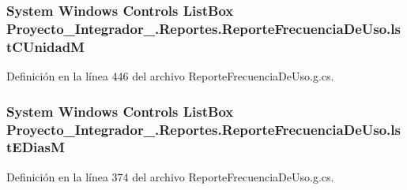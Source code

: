 \hypertarget{class_proyecto___integrador__3_1_1_reportes_1_1_reporte_frecuencia_de_uso_ab371c0b71730bbb785efdca10a7d2d41}{
\subsubsection[{lst\-C\-Unidad\-M}]{\setlength{\rightskip}{0pt plus 5cm}System Windows Controls List\-Box Proyecto\-\_\-\-Integrador\-\_.\-Reportes.\-Reporte\-Frecuencia\-De\-Uso.\-lst\-C\-Unidad\-M\hspace{0.3cm}{\ttfamily [package]}}}\label{class_proyecto___integrador__3_1_1_reportes_1_1_reporte_frecuencia_de_uso_ab371c0b71730bbb785efdca10a7d2d41}


Definición en la línea 446 del archivo Reporte\-Frecuencia\-De\-Uso.\-g.\-cs.

\hypertarget{class_proyecto___integrador__3_1_1_reportes_1_1_reporte_frecuencia_de_uso_a2b516015fab6b55141fe0b999e36e520}{
\subsubsection[{lst\-E\-Dias\-M}]{\setlength{\rightskip}{0pt plus 5cm}System Windows Controls List\-Box Proyecto\-\_\-\-Integrador\-\_.\-Reportes.\-Reporte\-Frecuencia\-De\-Uso.\-lst\-E\-Dias\-M\hspace{0.3cm}{\ttfamily [package]}}}\label{class_proyecto___integrador__3_1_1_reportes_1_1_reporte_frecuencia_de_uso_a2b516015fab6b55141fe0b999e36e520}


Definición en la línea 374 del archivo Reporte\-Frecuencia\-De\-Uso.\-g.\-cs.

